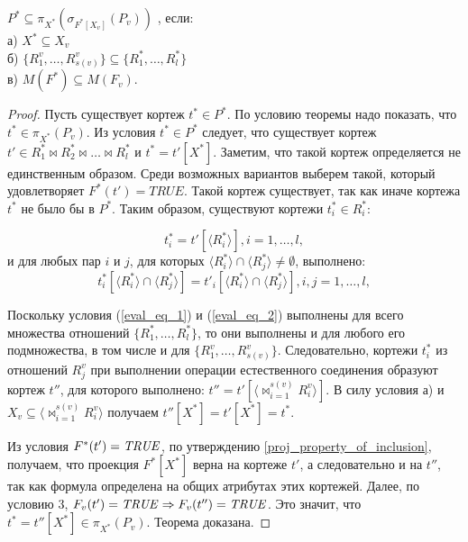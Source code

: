 \author{Мосин Сергей, Зыкин Сергей}
\begin{theorem}
$P^{\ast} \subseteq \pi_{X^{\ast}} (\sigma_{F^{\ast}[X_v]} (P_{v}))$
, если:
\\а) $X^{\ast} \subseteq X_{v}$
\\б) 
$ \{R^{v}_{1}, \ldots, R^{v}_{s(v)}\}
\subseteq
\{R^{\ast}_{1}, \ldots, R^{\ast}_{l}\} $
\\в) $M (F^{\ast}) \subseteq M (F_{v}) $.
\label{th_base}
\end{theorem} 
\begin{proof}
Пусть существует кортеж $t^{\ast} \in P^{\ast}$. По условию теоремы надо показать, 
что $t^{\ast} \in \pi_{X^{\ast}} (P_{v})$. Из условия $t^{\ast} \in P^{\ast}$ следует, 
что существует кортеж $t' \in R^{\ast}_1 \bowtie R^{\ast}_2\bowtie\ldots
\bowtie R^{\ast}_l$ и $t^{\ast} = t'[X^{\ast}]$. Заметим, что такой кортеж 
определяется не единственным образом. Среди возможных вариантов выберем такой, 
который удовлетворяет $F^{\ast}(t')=TRUE$. Такой кортеж существует, так как иначе
кортежа $t^{\ast}$ не было бы в $P^{\ast}$. Таким образом, существуют кортежи
$t^{\ast}_i \in R^{\ast}_i$:

\begin{equation}
t^{\ast}_i = t'[\langle R^{\ast}_i\rangle], i = 1,\dots,l,
\label{eval_eq_1}
\end{equation}
\def \intersecij {\langle R^{\ast}_i \rangle \cap \langle R^{\ast}_j \rangle}
и для любых пар $i$ и $j$, для которых $\intersecij \neq \emptyset$, выполнено:
\begin{equation}
t^{\ast}_i[\intersecij] = t'_i[\intersecij], i,j = 1,\dots,l,
\label{eval_eq_2}
\end{equation}

Поскольку условия (\ref{eval_eq_1}) и (\ref{eval_eq_2}) выполнены для всего множества
отношений $\{R^{\ast}_{1}, \ldots, R^{\ast}_{l}\}$, то они выполнены и для любого его
подмножества, в том числе и для $\{R^{v}_{1}, \ldots, R^{v}_{s(v)}\}$.
Следовательно, кортежи $t^{\ast}_i$ из отношений $R^{v}_j$ при выполнении операции
естественного соединения образуют кортеж $t''$, для которого выполнено:
$t'' = t'[\langle {\bowtie}_{i=1}^{s(v)} R^v_i \rangle]$. В силу условия а) и 
$X_v \subseteq \langle {\bowtie}_{i=1}^{s(v)} R^v_i \rangle$ получаем 
$t''[X^{\ast}] = t'[X^{\ast}] = t^{\ast}$.

Из условия  $F^{\ast}(t') = \mathit{TRUE}$, по утверждению
\ref{proj_property_of_inclusion}, получаем, что проекция $F^{\ast} [X^{\ast}]$
верна на кортеже $t'$, а следовательно и на $t''$, так как формула определена на
общих атрибутах этих кортежей. Далее, по условию 3, $F_v (t') = \mathit{TRUE} \Rightarrow F_v (t'') = \mathit{TRUE}$.
Это значит, что $t^{\ast} = t''[X^{\ast}] \in \pi_{X^{\ast}} (P_{v})$. Теорема
доказана.
\end{proof}

